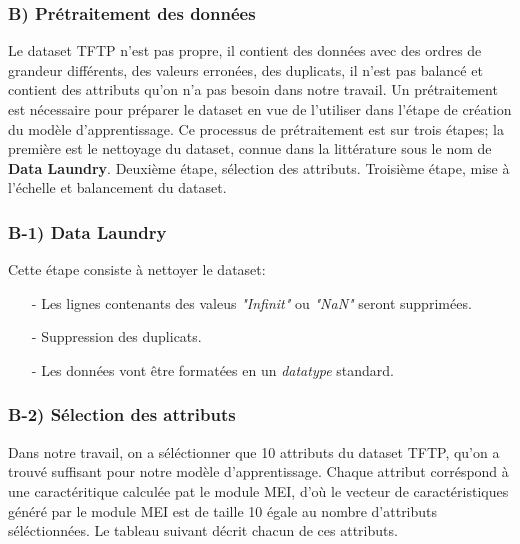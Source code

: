 \subsubsection{B) Prétraitement des données }
Le dataset TFTP n'est pas propre, il contient des données avec des ordres de grandeur différents, des valeurs erronées, des duplicats, il n'est pas balancé et contient des attributs qu'on n'a pas besoin dans notre travail. Un prétraitement est nécessaire pour préparer le dataset en vue de l'utiliser dans l'étape de création du modèle d'apprentissage. Ce processus de prétraitement est sur trois étapes; la première est le nettoyage du dataset, connue dans la littérature sous le nom de \textbf{Data Laundry}. Deuxième étape, sélection des attributs. Troisième étape, mise à l'échelle et balancement du dataset.

\subsubsection{B-1) Data Laundry}
Cette étape consiste à nettoyer le dataset:\\
\begin{itemize}
\item[-] Les lignes contenants des valeus \textit{"Infinit"} ou \textit{"NaN"} seront supprimées.
\item[-] Suppression des duplicats.
\item[-] Les données vont être formatées en un \textit{datatype} standard.
\end{itemize}

\subsubsection{B-2) Sélection des attributs}
\label{attributs}
Dans notre travail, on a séléctionner que 10 attributs du dataset TFTP, qu'on a trouvé suffisant pour notre modèle d'apprentissage. Chaque attribut corréspond à une caractéritique calculée pat le module MEI, d'où le vecteur de caractéristiques généré par le module MEI est de taille 10 égale au nombre d'attributs séléctionnées. Le tableau suivant décrit chacun de ces attributs.\\

